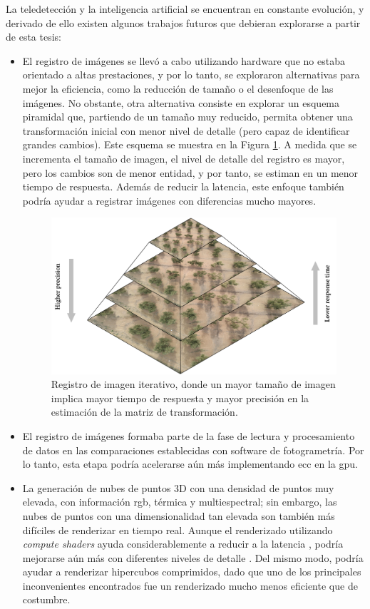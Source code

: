 La teledetección y la inteligencia artificial se encuentran en constante evolución, y derivado de ello existen algunos trabajos futuros que debieran explorarse a partir de esta tesis:
\begin{itemize}
    \item El registro de imágenes se llevó a cabo utilizando hardware que no estaba orientado a altas prestaciones, y por lo tanto, se exploraron alternativas para mejor la eficiencia, como la reducción de tamaño o el desenfoque de las imágenes. No obstante, otra alternativa consiste en explorar un esquema piramidal que, partiendo de un tamaño muy reducido, permita obtener una transformación inicial con menor nivel de detalle (pero capaz de identificar grandes cambios). Este esquema se muestra en la Figura \ref{fig:image_pyramid_spanish}. A medida que se incrementa el tamaño de imagen, el nivel de detalle del registro es mayor, pero los cambios son de menor entidad, y por tanto, se estiman en un menor tiempo de respuesta. Además de reducir la latencia, este enfoque también podría ayudar a registrar imágenes con diferencias mucho mayores.
    \begin{figure}
        \centering
        \includegraphics[width=\linewidth]{figs/conclusions/image_pyramid.png}
        \caption{Registro de imagen iterativo, donde un mayor tamaño de imagen implica mayor tiempo de respuesta y mayor precisión en la estimación de la matriz de transformación.}
        \label{fig:image_pyramid_spanish}
    \end{figure}
    \item El registro de imágenes formaba parte de la fase de lectura y procesamiento de datos en las comparaciones establecidas con software de fotogrametría. Por lo tanto, esta etapa podría acelerarse aún más implementando \acrshort{ecc} en la \acrshort{gpu}.
    \item La generación de nubes de puntos 3D con una densidad de puntos muy elevada, con información \acrshort{rgb}, térmica y multiespectral; sin embargo, las nubes de puntos con una dimensionalidad tan elevada son también más difíciles de renderizar en tiempo real. Aunque el renderizado utilizando \textit{compute shaders} ayuda considerablemente a reducir a la latencia \cite{schutz_rendering_2021}, podría mejorarse aún más con diferentes niveles de detalle \cite{schutz_gpu-accelerated_2023}. Del mismo modo, podría ayudar a renderizar hipercubos comprimidos, dado que uno de los principales inconvenientes encontrados fue un renderizado mucho menos eficiente que de costumbre.

\end{itemize}
